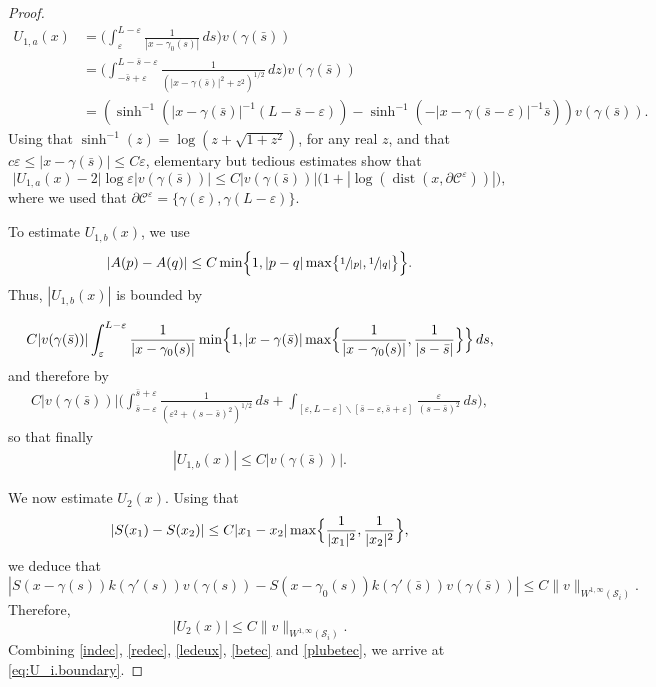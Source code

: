 \documentclass[JEP,XML,SOM,Unicode, NoEqCountersInSection,NoFloatCountersInSection,published]{cedram}
\let\eps\varepsilon
\newcommand{\dd}{\,d}
\DeclareMathOperator{\dist}{dist}
\theoremstyle{definition}
\theoremstyle{remark}
\begin{document}
\begin{proof}
\begin{align}
\nonumber
U_{1,a} (x) &=
\biggl(\int_\eps^{L-\eps} \frac 1 {|x - \gamma_0(s)|} \dd s \biggr) v(\gamma (\bar s))
\\\label{here}
&= \biggl(\int_{- \bar s + \eps}^{L - \bar s - \eps} \frac{1}{(|x - \gamma(\bar s)|^2 + z^2)^{1/2}} \dd z \biggr) v(\gamma (\bar s))
\\ \nonumber
&= (\sinh^{-1}(|x - \gamma(\bar s)|^{-1} (L- \bar s - \eps)) - \sinh^{-1}(- |x - \gamma(\bar s - \eps)|^{-1} \bar s)) v(\gamma (\bar s)).
\end{align}
Using that $\sinh^{-1}(z) = \log(z + \sqrt{1 + z^2})$, for any real $z$, and that $c \eps \leq |x - \gamma(\bar s)| \leq C \eps$, elementary but tedious estimates show
that
\begin{equation}
\label{ledeux}
\big|U_{1,a} (x) - 2 \left|\log \eps \right| v(\gamma (\bar s))\big| \leq C |v(\gamma (\bar s))| { \bigl(1 + \left|\log(\dist(x,\partial \mathcal C^\eps))\right| \bigr)},
\end{equation}
{where we used that $\partial \mathcal C^\eps = \{\gamma(\eps),\gamma(L - \eps)\}$.}

To estimate $U_{1,b} (x)$, we use
\begin{equation}
|A(p) - A(q)| \leq C \min\Bigl\{ 1, |p-q| \max \bigl\{\sfrac 1 {|p|}, \sfrac 1 {|q|} \bigr\} \Bigr\}.
\end{equation}
Thus, $ |U_{1,b} (x)| $ is bounded by

\begin{gather*}
C {|v(\gamma (\bar s))|} \int_\eps^{L-\eps} \frac 1 {|x - \gamma_0(s)|} \min\Bigl\{ 1, |x - \gamma(\bar s)| \max \Bigl\{\frac 1 {|x - \gamma_0(s)|}, \frac 1 {|s-\bar s|} \Bigr\} \Bigr\} \dd s,
\end{gather*}
and therefore by
\begin{gather*}
C{|v(\gamma (\bar s))|} \biggl(\int_{\bar s - \eps}^{\bar s + \eps} \frac 1 {(\eps^2 + (s - \bar s)^2)^{1/2}} \dd s + \int_{[\eps,L -\eps] \smallsetminus [\bar s - \eps, \bar s + \eps]} \frac \eps {(s - \bar s)^2} \dd s \biggr),
\end{gather*}
so that finally
\begin{gather}
\label{betec}
|U_{1,b} (x)| \leq C {|v(\gamma (\bar s))|}.
\end{gather}

We now estimate $U_2 (x)$.
Using that
\begin{equation}
|S(x_1) - S(x_2)| \leq C |x_1 - x_2| \max \Bigl\{\frac 1 {|x_1|^2}, \frac 1 {|x_2|^2} \Bigr\},
\end{equation}
we deduce that
\begin{equation*}
|S(x - \gamma(s)) k(\gamma'(s)) v(\gamma (s)) - S(x - \gamma_0(s)) k(\gamma'(\bar s)) v(\gamma (\bar s))|
\leq C{\|v\|_{W^{1,\infty} (\mathcal S_i)}}.
\end{equation*}
Therefore,
\begin{equation}
\label{plubetec}
|U_2 (x) |\leq C{\|v\|_{W^{1,\infty} (\mathcal S_i)}}.
\end{equation}
Combining \eqref{indec}, \eqref{redec}, \eqref{ledeux}, \eqref{betec} and \eqref{plubetec}, we arrive at \eqref{eq:U_i.boundary}.
\end{proof}
\end{document}
